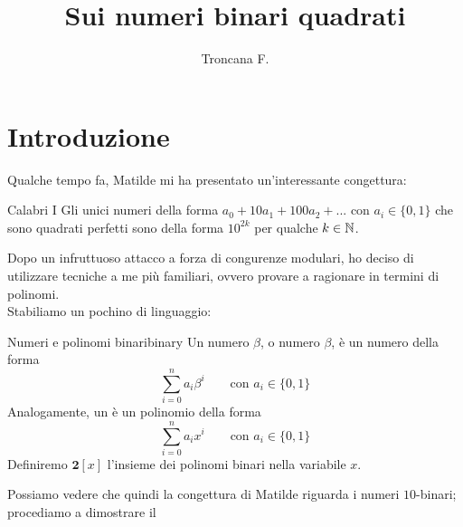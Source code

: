 \documentclass{article}
\title{Sui numeri binari quadrati}
\author{Troncana F.}
\date{}
\begin{document}
\maketitle

\section*{Introduzione}

Qualche tempo fa, Matilde mi ha presentato un'interessante congettura:

\begin{proposition}{Calabri I}{}
    Gli unici numeri della forma $a_0+10a_1+100a_2+...$ con $a_i \in \{0,1\}$ che sono quadrati perfetti sono della forma $10^{2k}$ per qualche $k \in \mathbb{N}$.
\end{proposition}

Dopo un infruttuoso attacco a forza di congurenze modulari, ho deciso di utilizzare tecniche a me più familiari, ovvero provare a ragionare in termini di polinomi.\\
Stabiliamo un pochino di linguaggio:

\begin{definition}{Numeri e polinomi binari}{binary}
    Un numero  $\beta$, o numero $\beta$, è un numero della forma
    \[\sum_{i=0}^n a_i \beta^i \qquad \text{con } a_i \in\{0,1\}\]
    Analogamente, un  è un polinomio della forma
    \[\sum_{i=0}^n a_i x^i \qquad \text{con } a_i \in\{0,1\}\]
    Definiremo $\mathbf{2}[x]$ l'insieme dei polinomi binari nella variabile $x$.
\end{definition}

Possiamo vedere che quindi la congettura di Matilde riguarda i numeri $10$-binari; procediamo a dimostrare il
\end{document}
